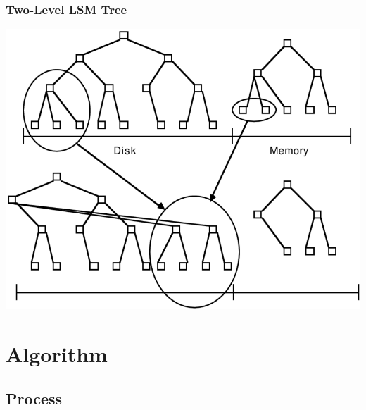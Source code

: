 \documentclass[
	11pt, 
]{beamer}
\begin{document}
\begin{frame}
    \frametitle{Two-Level LSM Tree}
    \begin{center}
         \includegraphics[scale=0.28]{TwoLevelLSM.png}
    \end{center}
\end{frame}


\section{Algorithm}

\subsection{Process}
\end{document}
